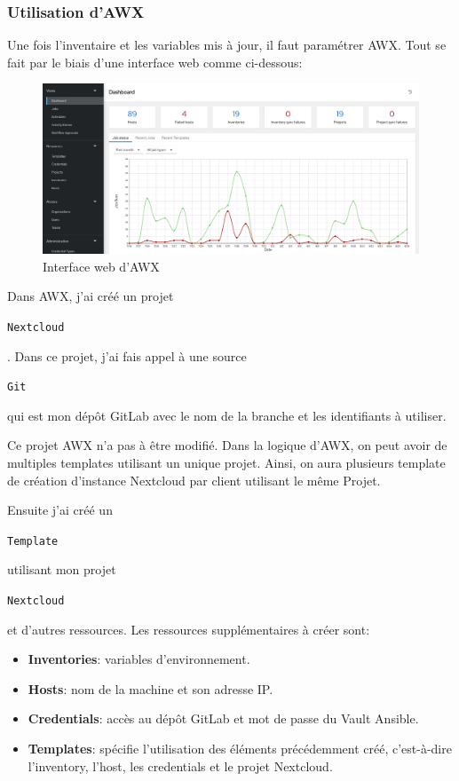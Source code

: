 \documentclass[12pt]{article}
\begin{document}
\subsubsection{Utilisation d'AWX}
Une fois l'inventaire et les variables mis à jour, il faut paramétrer AWX. 
Tout se fait par le biais d'une interface web comme ci-dessous:
\begin{figure}[!ht]
    \centering
    \includegraphics[width=\textwidth]{src/interface_awx.png}
    \caption{Interface web d'AWX}
    \label{fig:awx}
\end{figure}

Dans AWX, j'ai créé un projet \begin{code}\texttt{\gls{Nextcloud}}\end{code}. 
Dans ce projet, j'ai fais appel à une source \begin{code}\texttt{Git}\end{code} qui est mon dépôt \gls{GitLab} avec le nom de la branche et les identifiants à utiliser. 

Ce projet AWX n'a pas à être modifié.
Dans la logique d'AWX, on peut avoir de multiples templates utilisant un unique projet.
Ainsi, on aura plusieurs template de création d'instance \gls{Nextcloud} par client utilisant le même Projet.

Ensuite j'ai créé un \begin{code}\texttt{Template}\end{code} utilisant mon projet \begin{code}\texttt{\gls{Nextcloud}}\end{code} et d'autres ressources. 
Les ressources supplémentaires à créer sont:
\begin{itemize}
    \item \textbf{Inventories}: variables d'environnement. 
    \item \textbf{Hosts}: nom de la machine et son adresse \gls{IP}.
    \item \textbf{Credentials}:  accès au dépôt \gls{GitLab} et mot de passe du Vault \gls{Ansible}.
    \item \textbf{Templates}: spécifie l'utilisation des éléments précédemment créé, c'est-à-dire l'inventory, l'host, les credentials et le projet \gls{Nextcloud}.
\end{itemize}
\end{document}
